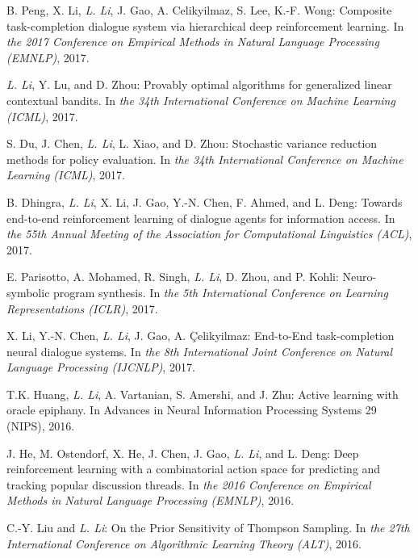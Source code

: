 \documentclass[10pt,twoside,letterpaper]{article}
\newcommand{\selffont}[1]{{\textit{#1}}}
\newcommand{\venuefont}[1]{{\textit{#1}}}
\newcommand{\myself}{\selffont{L. Li}}
\begin{document}
\begin{compactenum}[(C1)]
\item{B. Peng, X. Li, \myself, J. Gao, A. Celikyilmaz, S. Lee, K.-F. Wong: Composite task-completion dialogue system via hierarchical deep reinforcement learning.  In \venuefont{the 2017 Conference on Empirical Methods in Natural Language Processing (EMNLP)}, 2017.}

\item{\myself, Y. Lu, and D. Zhou: Provably optimal algorithms for generalized linear contextual bandits.  In \venuefont{the 34th International Conference on Machine Learning (ICML)}, 2017.}

\item{S. Du, J. Chen, \myself, L. Xiao, and D. Zhou: Stochastic variance reduction methods for policy evaluation.  In \venuefont{the 34th International Conference on Machine Learning (ICML)}, 2017.}

\item{B. Dhingra, \myself, X. Li, J. Gao, Y.-N. Chen, F. Ahmed, and L. Deng: Towards end-to-end reinforcement learning of dialogue agents for information access.  In \venuefont{the 55th Annual Meeting of the Association for Computational Linguistics (ACL)}, 2017.}

\item{E. Parisotto, A. Mohamed, R. Singh, \myself, D. Zhou, and P. Kohli: Neuro-symbolic program synthesis.  In \venuefont{the 5th International Conference on Learning Representations (ICLR)}, 2017.}

\item{X. Li, Y.-N. Chen, \myself, J. Gao, A. Çelikyilmaz: End-to-End task-completion neural dialogue systems.  In \venuefont{the 8th International Joint Conference on Natural Language Processing (IJCNLP)}, 2017.}

\item{T.K. Huang, \myself, A. Vartanian, S. Amershi, and J. Zhu: Active learning with oracle epiphany.  In Advances in Neural Information Processing Systems 29 (NIPS), 2016.}

\item{J. He, M. Ostendorf, X. He, J. Chen, J. Gao, \myself, and L. Deng: Deep reinforcement learning with a combinatorial action space for predicting and tracking popular discussion threads.  In \venuefont{the 2016 Conference on Empirical Methods in Natural Language Processing (EMNLP)}, 2016.}

\item{C.-Y. Liu and \myself: On the Prior Sensitivity of Thompson Sampling. In \venuefont{the 27th International Conference on Algorithmic Learning Theory (ALT)}, 2016.}


\end{compactenum}
\end{document}
